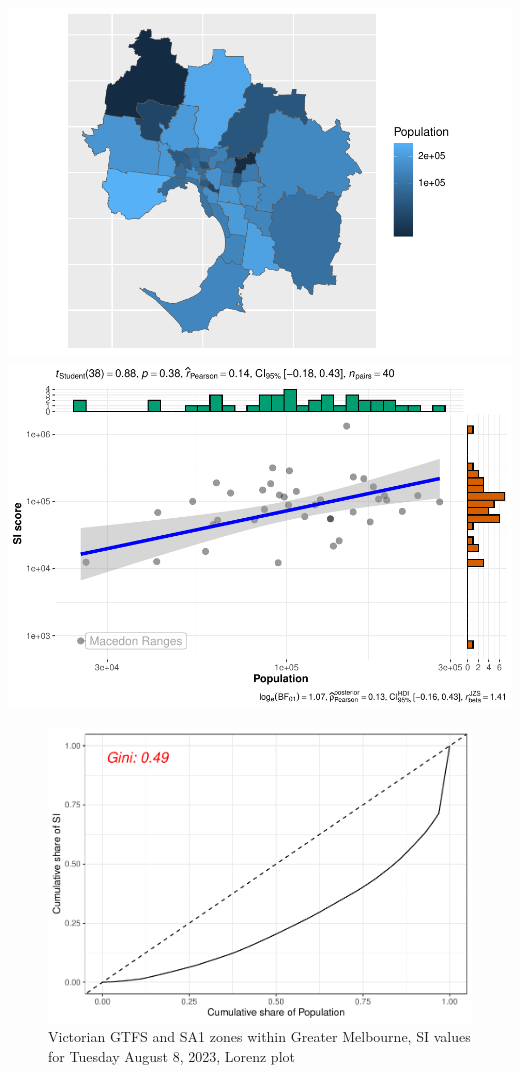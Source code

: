 \documentclass[preprint, 3p,
authoryear]{elsarticle} %
\begin{document}
\includegraphics{Leveraging_GTFS_to_assess_transit_supply_Transport_Geography_files/figure-latex/gghistostats_greater_melbourne_230808_by_sa3-2.pdf}
\includegraphics{Leveraging_GTFS_to_assess_transit_supply_Transport_Geography_files/figure-latex/gghistostats_greater_melbourne_230808_by_sa3-3.pdf}

\begin{figure}
\centering
\includegraphics{Leveraging_GTFS_to_assess_transit_supply_Transport_Geography_files/figure-latex/Gini_coefficients_sa3-1.pdf}
\caption{Victorian GTFS and SA1 zones within Greater Melbourne, SI
values for Tuesday August 8, 2023, Lorenz plot}
\end{figure}
\end{document}

